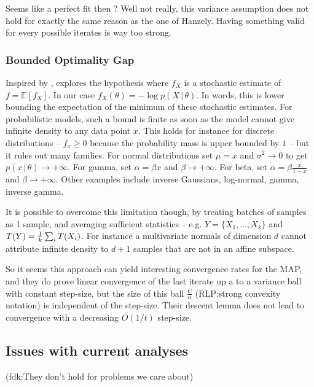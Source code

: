 \documentclass[twoside]{article}
\newcommand{\rlp}[1]{\textcolor{BrickRed}{(RLP:#1)}}
\newcommand{\fdk}[1]{\textcolor{Periwinkle}{(fdk:#1)}}
\newcommand*{\expect}[2][]{\ensuremath{\mathbb{E}_{#1} \left[ #2 \right] }} %
\newcommand*{\expecti}[2][]{\ensuremath{\mathbb{E}_{#1} [ #2 ] }} %
\newcommand{\cond}{\,\vert\,}
\newcommand{\nat}{\theta}
\begin{document}
Seems like a perfect fit then ? Well not really, this variance assumption does not hold for exactly the same reason as the one of Hanzely. Having something valid for every possible iterates is way too strong. 

\subsubsection{Bounded Optimality Gap}
Inspired by \citet{loizou2021stochastic}, \citet{dorazio2021stochastic} explores the hypothesis
\alignn{
\min_\nat f(\nat) - \expect[X]{\min_\nat f_X(\nat)} \leq C 
\label{eq:dorazio}
}
where $f_X$ is a stochastic estimate of $f = \expecti{f_X}$. In our case $f_X(\nat) = - \log p(X\cond \nat)$.
In words, this is lower bounding the expectation of the minimum of these stochastic estimates.
For probabilistic models, such a bound is finite as soon as the model cannot give infinite density to any data point $x$.
This holds for instance for discrete distributions 
-- $f_x\geq 0$ because the probability mass is upper bounded by $1$ -- 
but it rules out  many families.
For normal distributions set $\mu=x$ and $\sigma^2 \rightarrow 0$ to get $p(x\cond \nat) \rightarrow +\infty$. 
For gamma, set $\alpha = \beta x$ and $\beta \rightarrow +\infty$.
For beta, set $\alpha=\beta \frac{x}{1-x}$ and $\beta \rightarrow +\infty$.
 Other examples include inverse Gaussians, log-normal, gamma, inverse gamma.
 
 It is possible to overcome this limitation though, by treating batches of samples as 1 sample, and averaging sufficient statistics -- e.g. $Y = \{X_1, \dots, X_k\}$ and $T(Y) = \frac{1}{k}\sum_i T(X_i)$.
 For instance a multivariate normals of dimension $d$ cannot attribute infinite density to $d+1$ samples that are not in an affine subspace.

So it seems this approach can yield interesting convergence rates for the MAP, and they do prove linear convergence of the last iterate up a to a variance ball with constant step-size, but the size of this ball $\frac{C}{\alpha}$ \rlp{strong convexity notation} is independent of  the step-size. Their descent lemma does not lead to convergence with a decreasing $O(1/t)$ step-size. 


\subsection{Issues with current analyses}

\fdk{They don't hold for problems we care about}
\end{document}
